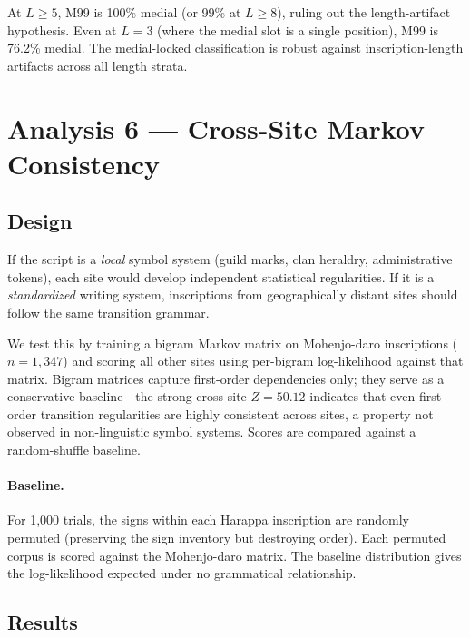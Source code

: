 \documentclass[12pt,letterpaper]{article}
\begin{document}
At $L \ge 5$, M99 is 100\% medial (or 99\% at $L \ge 8$), ruling out
the length-artifact hypothesis.
Even at $L = 3$ (where the medial slot is a single position), M99
is 76.2\% medial.
The medial-locked classification is robust against inscription-length
artifacts across all length strata.

\section{Analysis 6 --- Cross-Site Markov Consistency}
\label{sec:crosssite}

\subsection{Design}

If the script is a \emph{local} symbol system (guild marks, clan
heraldry, administrative tokens), each site would develop independent
statistical regularities.
If it is a \emph{standardized} writing system, inscriptions from
geographically distant sites should follow the same transition grammar.

We test this by training a bigram Markov matrix on Mohenjo-daro
inscriptions ($n = 1{,}347$) and scoring all other sites using
per-bigram log-likelihood against that matrix.
Bigram matrices capture first-order dependencies only; they serve
as a conservative baseline---the strong cross-site $Z = 50.12$
indicates that even first-order transition regularities are highly
consistent across sites, a property not observed in non-linguistic
symbol systems.
Scores are compared against a
random-shuffle baseline.

\paragraph{Baseline.}
For 1,000 trials, the signs within each Harappa inscription are randomly
permuted (preserving the sign inventory but destroying order).
Each permuted corpus is scored against the Mohenjo-daro matrix.
The baseline distribution gives the log-likelihood expected under no
grammatical relationship.

\subsection{Results}
\end{document}
